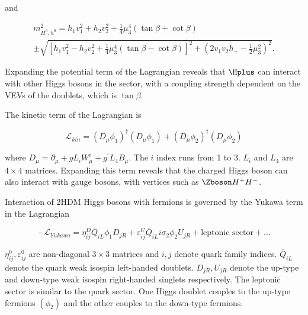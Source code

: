 and 

\begin{equation}
\begin{split}
m_{H^0,h^0}^2 = h_1v_1^2 + h_2v_2^2 + \frac{1}{4}\mu_3^4(\tan\beta+\cot\beta) \\
\pm \sqrt{\left [ h_1v_1^2 - h_2v_2^2 + \frac{1}{4}\mu_3^4(\tan\beta-\cot\beta)\right ]^2  
+ \left (2v_1v_2h_+ - \frac{1}{2}\mu_3^2  \right )^2}. 
\end{split}
\end{equation}

Expanding the potential term of the Lagrangian reveals that $\Hplus$ can interact with 
other Higgs bosons in the sector,  
with a coupling strength dependent on the VEVs of the doublets, which is $\tan\beta$.

\par The kinetic term of the Lagrangian is 

\begin{equation}
\mathcal{L}_{kin} = (D_\mu\phi_1)^\dagger(D_\mu\phi_1) + (D_\mu\phi_2)^\dagger(D_\mu\phi_2)  
\end{equation}

where $D_\mu = \partial_\mu + gL_iW^i_\mu + g^{'}L_4B_\mu$. The $i$ index runs from 1 to 3.  
$L_i$ and $L_4$ are $4\times4$ matrices. Expanding this term reveals that the charged Higgs boson can also 
interact with gauge bosons, with vertices such as $\Zboson H^+H^-$. 

\par Interaction of 2HDM Higgs bosons with fermions is governed by the Yukawa term in the Lagrangian 

\begin{equation}
-\mathcal{L}_{Yukawa} = \eta_{ij}^{D}\overline{Q}_{iL}\phi_1D_{jR} + \varepsilon_{ij}^{U}\overline{Q}_{iL}i\sigma_2\phi_2U_{jR} + \text{leptonic sector} + ...
\label{eq:yk}
\end{equation}

$\eta^0_{ij},\varepsilon^0_{ij}$ are non-diagonal $3\times 3$ matrices and $i,j$ denote quark family 
indices. $\overline{Q}_{iL}$ denote the quark weak isospin left-handed doublets. $D_{jR}, U_{jR}$ denote the 
up-type and down-type weak isospin right-handed singlets respectively. The leptonic sector is similar to 
the quark sector. One Higgs doublet couples to the up-type fermions $(\phi_2)$ and the other couples to the 
down-type fermions. 
